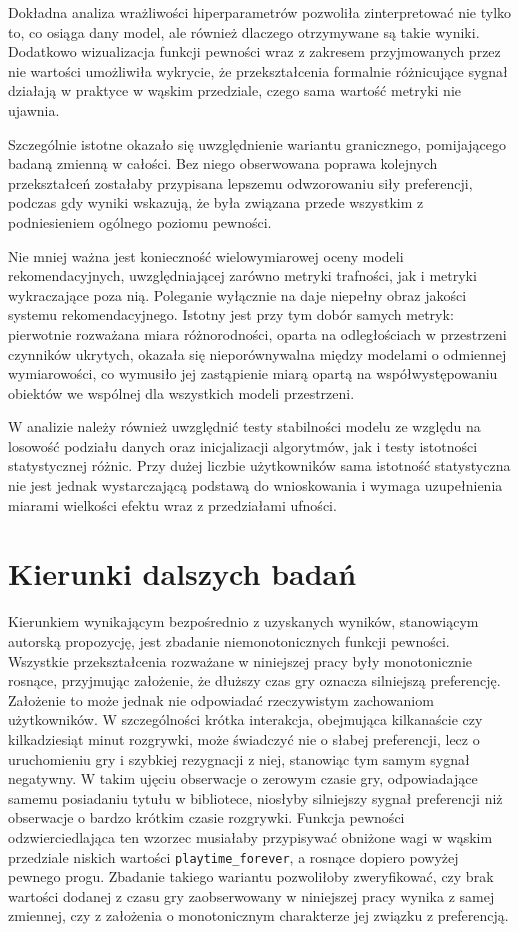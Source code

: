 Dokładna analiza wrażliwości hiperparametrów pozwoliła zinterpretować nie tylko to, co osiąga dany model, ale również dlaczego otrzymywane są takie wyniki. Dodatkowo wizualizacja funkcji pewności wraz z zakresem przyjmowanych przez nie wartości umożliwiła wykrycie, że przekształcenia formalnie różnicujące sygnał działają w praktyce w wąskim przedziale, czego sama wartość metryki nie ujawnia.

Szczególnie istotne okazało się uwzględnienie wariantu granicznego, pomijającego badaną zmienną w całości. Bez niego obserwowana poprawa kolejnych przekształceń zostałaby przypisana lepszemu odwzorowaniu siły preferencji, podczas gdy wyniki wskazują, że była związana przede wszystkim z podniesieniem ogólnego poziomu pewności.

Nie mniej ważna jest konieczność wielowymiarowej oceny modeli rekomendacyjnych, uwzględniającej zarówno metryki trafności, jak i metryki wykraczające poza nią. Poleganie wyłącznie na \ndcg{} daje niepełny obraz jakości systemu rekomendacyjnego. Istotny jest przy tym dobór samych metryk: pierwotnie rozważana miara różnorodności, oparta na odległościach w przestrzeni czynników ukrytych, okazała się nieporównywalna między modelami o odmiennej wymiarowości, co wymusiło jej zastąpienie miarą opartą na współwystępowaniu obiektów we wspólnej dla wszystkich modeli przestrzeni.

W analizie należy również uwzględnić testy stabilności modelu ze względu na losowość podziału danych oraz inicjalizacji algorytmów, jak i testy istotności statystycznej różnic. Przy dużej liczbie użytkowników sama istotność statystyczna nie jest jednak wystarczającą podstawą do wnioskowania i wymaga uzupełnienia miarami wielkości efektu wraz z przedziałami ufności.

\section{Kierunki dalszych badań}

Kierunkiem wynikającym bezpośrednio z uzyskanych wyników, stanowiącym autorską propozycję, jest zbadanie niemonotonicznych funkcji pewności. Wszystkie przekształcenia rozważane w niniejszej pracy były monotonicznie rosnące, przyjmując założenie, że dłuższy czas gry oznacza silniejszą preferencję. Założenie to może jednak nie odpowiadać rzeczywistym zachowaniom użytkowników. W szczególności krótka interakcja, obejmująca kilkanaście czy kilkadziesiąt minut rozgrywki, może świadczyć nie o słabej preferencji, lecz o uruchomieniu gry i szybkiej rezygnacji z niej, stanowiąc tym samym sygnał negatywny. W takim ujęciu obserwacje o zerowym czasie gry, odpowiadające samemu posiadaniu tytułu w bibliotece, niosłyby silniejszy sygnał preferencji niż obserwacje o bardzo krótkim czasie rozgrywki. Funkcja pewności odzwierciedlająca ten wzorzec musiałaby przypisywać obniżone wagi w wąskim przedziale niskich wartości \texttt{playtime\_forever}, a rosnące dopiero powyżej pewnego progu. Zbadanie takiego wariantu pozwoliłoby zweryfikować, czy brak wartości dodanej z czasu gry zaobserwowany w niniejszej pracy wynika z samej zmiennej, czy z założenia o monotonicznym charakterze jej związku z preferencją.


